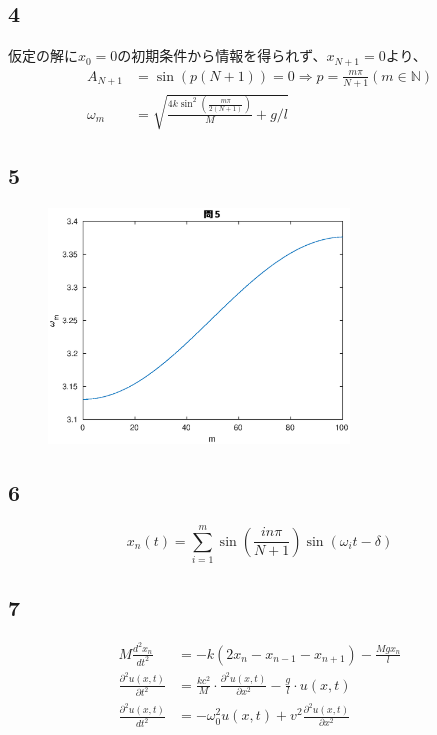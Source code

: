 \documentclass{jreport}
\begin{document}
\subsection{4}
仮定の解に$x_0=0$の初期条件から情報を得られず、$x_{N+1} =0$より、\\
\begin{equation}
	\begin{aligned}
	A_{N+1} &=\sin (p(N+1)) =0 \Rightarrow p =\frac{m \pi}{N+1} (m \in \mathbb{N}) \\
		\omega_m &=\sqrt{\frac{4k\sin^2 (\frac{m \pi}{2(N+1)})}{M} + g/l }
	\end{aligned}
\end{equation}
\subsection{5}
\begin{figure}[H]
	\centering
	\includegraphics[width=8cm]{5.eps}
\end{figure}
\subsection{6}
\begin{equation}
	x_n(t) = \sum_{i=1}^{m} \sin (\frac{in\pi}{N+1}) \sin ( \omega_i t- \delta) 
\end{equation}
\subsection{7}
\begin{equation}
	\begin{aligned}
		M\frac{d^2x_n}{dt^2} &= -k (2x_n - x_{n-1} -x_{n+1} ) -\frac{Mgx_n}{l}\\
		\frac{\partial^2 u(x,t)}{\partial t^2} & =\frac{kc^2}{M} \cdot \frac{\partial^2 u(x,t)}{\partial x^2} -\frac{g}{l} \cdot u(x,t) \\
		\frac{\partial^2 u(x,t)}{dt^2} &= -\omega_0^2 u(x,t) + v^2 \frac{\partial^2 u(x,t)}{\partial x^2}
	\end{aligned}
\end{equation}
\end{document}
